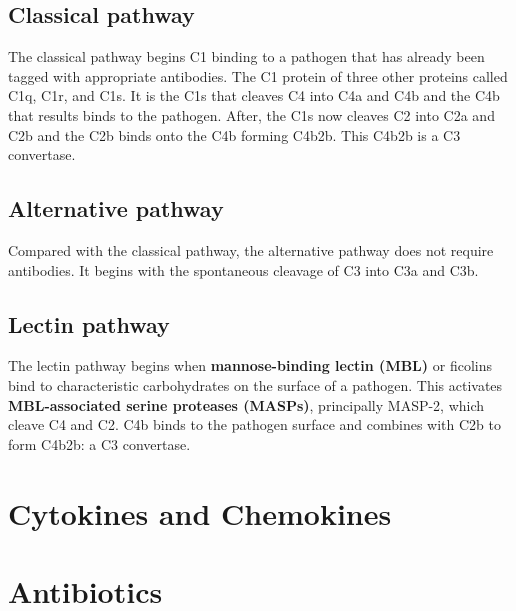 \subsection{Classical pathway}

The classical pathway begins C1 binding to a pathogen that has already been tagged with appropriate antibodies. The C1 protein of three other proteins called C1q, C1r, and C1s. It is the C1s that cleaves C4 into C4a and C4b and the C4b that results binds to the pathogen. After, the C1s now cleaves C2 into C2a and C2b and the C2b binds onto the C4b forming C4b2b. This C4b2b is a C3 convertase.

\subsection{Alternative pathway}

Compared with the classical pathway, the alternative pathway does not require antibodies. It begins with the spontaneous cleavage of C3 into C3a and C3b.

\subsection{Lectin pathway}

The lectin pathway begins when \textbf{mannose-binding lectin (MBL)} or ficolins bind to characteristic carbohydrates on the surface of a pathogen. This activates \textbf{MBL-associated serine proteases (MASPs)}, principally MASP-2, which cleave C4 and C2. C4b binds to the pathogen surface and combines with C2b to form C4b2b: a C3 convertase.


\section{Cytokines and Chemokines}

\section{Antibiotics}

